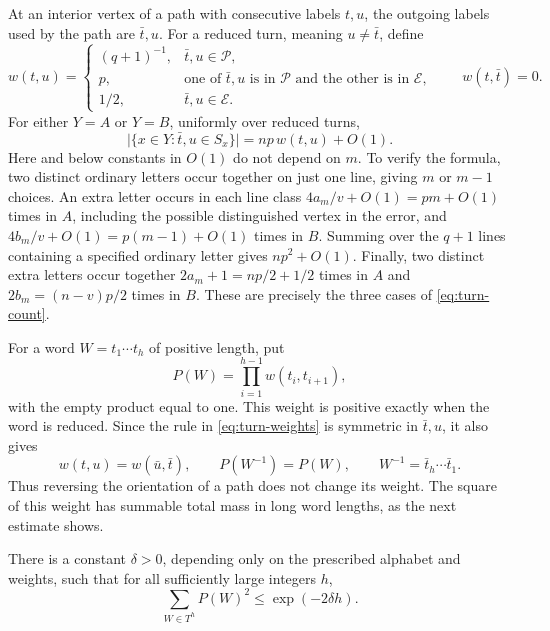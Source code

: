 At an interior vertex of a path with consecutive labels \(t,u\), the
outgoing labels used by the path are \(\bar t,u\).  For a reduced
turn, meaning \(u\ne\bar t\), define
\begin{equation}\label{eq:turn-weights}
 w(t,u)=
 \begin{cases}
 (q+1)^{-1},&\bar t,u\in\mathcal P,\\
 p,&\text{one of }\bar t,u\text{ is in }\mathcal P
          \text{ and the other is in }\mathcal E,\\
 1/2,&\bar t,u\in\mathcal E.
 \end{cases}
 \qquad w(t,\bar t)=0.
\end{equation}
For either \(Y=A\) or \(Y=B\), uniformly over reduced turns,
\begin{equation}\label{eq:turn-count}
 \bigl|\{x\in Y:\bar t,u\in S_x\}\bigr|
       =np\,w(t,u)+O(1).
\end{equation}
Here and below constants in \(O(1)\) do not depend on \(m\).
To verify the formula, two distinct ordinary letters occur together
on just one line, giving \(m\) or \(m-1\) choices.  An extra letter
occurs in each line class \(4a_m/v+O(1)=pm+O(1)\) times in \(A\),
including the possible distinguished vertex in the error, and
\(4b_m/v+O(1)=p(m-1)+O(1)\) times in \(B\).  Summing over the
\(q+1\) lines containing a specified ordinary letter gives
\(np^2+O(1)\).  Finally, two distinct extra letters occur together
\(2a_m+1=np/2+1/2\) times in \(A\) and
\(2b_m=(n-v)p/2\) times in \(B\).  These are precisely the three
cases of \eqref{eq:turn-count}.

For a word \(W=t_1\cdots t_h\) of positive length, put
\begin{equation}\label{eq:word-weight}
 P(W)=\prod_{i=1}^{h-1}w(t_i,t_{i+1}),
\end{equation}
with the empty product equal to one.  This weight is positive exactly
when the word is reduced.  Since the rule in \eqref{eq:turn-weights}
is symmetric in \(\bar t,u\), it also gives
\[
 w(t,u)=w(\bar u,\bar t),\qquad
 P(W^{-1})=P(W),\qquad W^{-1}=\bar t_h\cdots\bar t_1.
\]
Thus reversing the orientation of a path does not change its weight.
The square of this weight has summable total mass in long word lengths,
as the next estimate shows.

\begin{lemma}\label{lem:word-decay}
There is a constant \(\delta>0\), depending only on the prescribed
alphabet and weights, such that for all sufficiently large integers
\(h\),
\begin{equation}\label{eq:word-decay}
 \sum_{W\in T^h}P(W)^2\le \exp(-2\delta h).
\end{equation}
\end{lemma}

